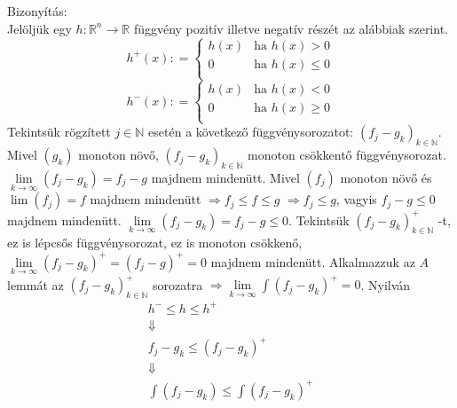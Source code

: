 \documentclass[12pt,a4paper]{scrartcl}
\newenvironment{bizonyitas}{}{}
\begin{document}
\begin{bizonyitas}

Bizonyítás:\\
Jelöljük egy
\(\left. h:{\mathbb{R}}^{n}\rightarrow{\mathbb{R}} \right.\) függvény
pozitív illetve negatív részét az alábbiak szerint.
\[h^{+}\left( x \right): = \left\{ \begin{matrix}
{h\left( x \right)} & {\text{ha~}h\left( x \right) > 0} \\
0 & {\text{ha~}h\left( x \right) \leq 0} \\
\end{matrix} \right.\] \[h^{-}\left( x \right): = \left\{ \begin{matrix}
{h\left( x \right)} & {\text{ha~}h\left( x \right) < 0} \\
0 & {\text{ha~}h\left( x \right) \geq 0} \\
\end{matrix} \right.\] Tekintsük rögzített \(j \in {\mathbb{N}}\) esetén
a következő függvénysorozatot:
\(\left( {f_{j} - g_{k}} \right)_{k \in {\mathbb{N}}}\). Mivel
\(\left( g_{k} \right)\) monoton növő,
\(\left( {f_{j} - g_{k}} \right)_{k \in {\mathbb{N}}}\) monoton
csökkentő függvénysorozat.
\(\lim\limits_{k\rightarrow\infty}\left( {f_{j} - g_{k}} \right) = f_{j} - g\)
majdnem mindenütt. Mivel \(\left( f_{j} \right)\) monoton növő és
\(\lim\left( f_{j} \right) = f\) majdnem mindenütt
\(\left. \Rightarrow f_{j} \leq f \leq g \right.\)
\(\left. \Rightarrow f_{j} \leq g \right.\), vagyis \(f_{j} - g \leq 0\)
majdnem mindenütt.
\(\lim\limits_{k\rightarrow\infty}\left( {f_{j} - g_{k}} \right) = f_{j} - g \leq 0\).
Tekintsük \(\left( {f_{j} - g_{k}} \right)_{k \in {\mathbb{N}}}^{+}\)
-t, ez is lépcsős függvénysorozat, ez is monoton csökkenő,
\(\lim\limits_{k\rightarrow\infty}\left( {f_{j} - g_{k}} \right)^{+} = \left( {f_{j} - g} \right)^{+} = 0\)
majdnem mindenütt. Alkalmazzuk az \(A\) lemmát az
\(\left( {f_{j} - g_{k}} \right)_{k \in {\mathbb{N}}}^{+}\) sorozatra
\(\left. \Rightarrow\lim\limits_{k\rightarrow\infty}{\int\left( {f_{j} - g_{k}} \right)^{+}} = 0 \right.\).
Nyilván \[\begin{gathered}
  {h^ - } \leqslant h \leqslant {h^ + } \\ 
   \Downarrow  \\ 
  {f_j} - {g_k} \leqslant {\left( {{f_j} - {g_k}} \right)^ + } \\ 
   \Downarrow  \\ 
  \int {\left( {{f_j} - {g_k}} \right)}  \leqslant \int {{{\left( {{f_j} - {g_k}} \right)}^ + }}  \\ 

\end{gathered}\]
\end{bizonyitas}
\end{document}

